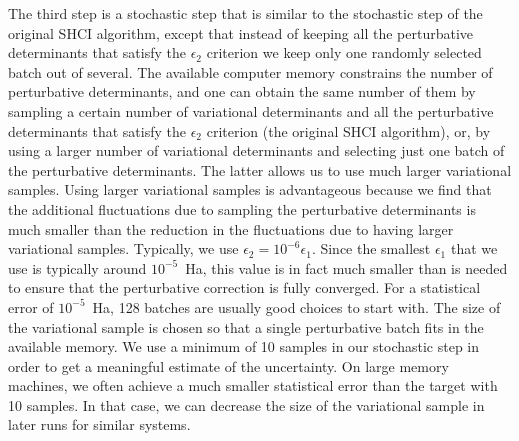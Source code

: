 \documentclass[%
reprint,
 superscriptaddress,
 amsmath,amssymb,
 aps,
]{revtex4-1}
\begin{document}


The third step is a stochastic step that is similar to the stochastic step of the original SHCI algorithm, except that instead of keeping all the perturbative determinants
that satisfy the $\epsilon_2$ criterion we keep only one randomly selected batch out of several.
The available computer memory constrains the number of perturbative determinants, and one can obtain the same number of them by sampling a certain
number of variational determinants and all the perturbative determinants that satisfy the $\epsilon_2$ criterion (the original SHCI algorithm),
or, by using a larger number of variational determinants and selecting just one batch of the perturbative determinants.
The latter allows us to use much larger variational samples.
Using larger variational samples is advantageous because we find that the additional fluctuations
due to sampling the perturbative determinants is much smaller than the reduction in the fluctuations due to having larger variational samples.
Typically, we use $\epsilon_2 = 10^{-6} \epsilon_{1}$.  Since the smallest $\epsilon_{1}$ that we use is typically around $10^{-5}$~Ha,
this value is in fact much smaller than is needed to ensure that the perturbative correction is fully converged.
For a statistical error of $10^{-5}$~Ha, 128 batches are usually good choices to start with.
The size of the variational sample is chosen so that a single perturbative batch fits in the available memory.
We use a minimum of 10 samples in our stochastic step in order to get a meaningful estimate of the uncertainty.
On large memory machines, we often achieve a much smaller statistical error than the target with 10 samples.
In that case, we can decrease the size of the variational sample in later runs for similar systems.
\end{document}
